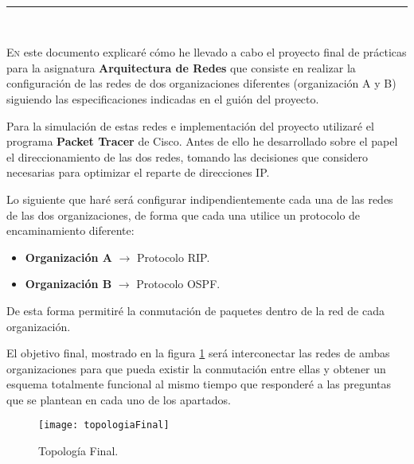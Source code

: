 
\begin{center}
	{\fboxrule=4pt } \\
	\rule{15cm}{0pt} \\
\end{center}

 
 \lettrine[lines=3, depth = 0]{E}{n} este documento explicar\'e c\'omo he llevado a cabo el proyecto final de prácticas para la asignatura \textbf{Arquitectura de Redes} que consiste en realizar la configuraci\'on de las redes de dos organizaciones diferentes (organizaci\'on A y B) siguiendo las especificaciones indicadas en el gui\'on del proyecto.
 
\par Para la simulación de estas redes e implementación del proyecto utilizaré el programa \textbf{Packet Tracer} de Cisco. Antes de ello he desarrollado sobre el papel el direccionamiento de las dos redes, tomando las decisiones que considero necesarias para optimizar el reparte de direcciones IP.
\par Lo siguiente que haré será configurar indipendientemente cada una de las redes de las dos organizaciones, de forma que cada una utilice un protocolo de encaminamiento diferente: 
 \begin{itemize}
 	\item \textbf{Organización A} $\rightarrow$ Protocolo RIP.
	\item \textbf{Organización B} $\rightarrow$ Protocolo OSPF.
 \end{itemize}
\par De esta forma permitiré la conmutación de paquetes dentro de la red de cada organización.
\par El objetivo final, mostrado en la figura \ref{fig:topologia} será interconectar las redes de ambas organizaciones para que pueda existir la conmutación entre ellas y obtener un esquema totalmente funcional al mismo tiempo que responderé a las preguntas que se plantean en cada uno de los apartados.

\begin{figure}[H]
	\texttt{[image: topologiaFinal]}
	\centering
	\caption{Topología Final.}
    	\label{fig:topologia}
\end{figure}


\newpage
{}